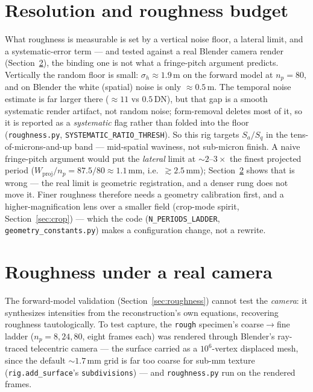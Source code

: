 \documentclass[11pt]{article}
\begin{document}
\section{Resolution and roughness budget}
\label{sec:roughness-budget}

What roughness is measurable is set by a vertical noise floor, a lateral
limit, and a systematic-error term --- and tested against a real Blender
camera render (Section~\ref{sec:roughness-camera}), the binding one is not
what a fringe-pitch argument predicts. Vertically the random floor is
small: $\sigma_h\approx1.9$\,\textmu m on the forward model at $n_p=80$,
and on Blender the white (spatial) noise is only $\approx0.5$\,\textmu m.
The temporal noise estimate is far larger there ($\approx11$ vs
$0.5$\,DN), but that gap is a smooth systematic render artifact, not random
noise; form-removal deletes most of it, so it is reported as a
\emph{systematic} flag rather than folded into the floor
(\texttt{roughness.py}, \texttt{SYSTEMATIC\_RATIO\_THRESH}). So this rig
targets $S_a/S_q$ in the tens-of-microns-and-up band --- mid-spatial
waviness, not sub-micron finish. A naive fringe-pitch argument would put
the \emph{lateral} limit at $\sim\!2$--$3\times$ the finest projected
period ($W_{\text{proj}}/n_p=87.5/80\approx1.1$\,mm, i.e.\
$\gtrsim2.5$\,mm); Section~\ref{sec:roughness-camera} shows that is wrong
--- the real limit is geometric registration, and a denser rung does not
move it. Finer roughness therefore needs a geometry calibration first, and
a higher-magnification lens over a smaller field (crop-mode spirit,
Section~\ref{sec:crop}) --- which the code
(\texttt{N\_PERIODS\_LADDER}, \texttt{geometry\_constants.py}) makes a
configuration change, not a rewrite.

\section{Roughness under a real camera}
\label{sec:roughness-camera}

The forward-model validation (Section~\ref{sec:roughness}) cannot test the
\emph{camera}: it synthesizes intensities from the reconstruction's own
equations, recovering roughness tautologically. To test capture, the
\texttt{rough} specimen's coarse$\to$fine ladder ($n_p=8,24,80$, eight
frames each) was rendered through Blender's ray-traced telecentric camera
--- the surface carried as a $10^6$-vertex displaced mesh, since the
default $\sim\!1.7$\,mm grid is far too coarse for sub-mm texture
(\texttt{rig.add\_surface}'s \texttt{subdivisions}) --- and
\texttt{roughness.py} run on the rendered frames.
\end{document}
